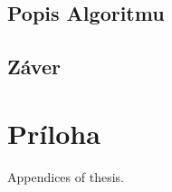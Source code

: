 \documentclass[
  printed, %
  table,   %
  lof,     %
  lot,     %
]{fithesis3}
\begin{document}
\section{Popis Algoritmu}

\section{Záver}

\makeatletter\thesis@blocks@clear\makeatother
{} %
\printindex

\appendix %
\chapter{Príloha}
Appendices of thesis.
\end{document}
